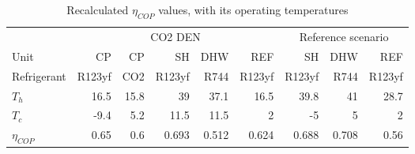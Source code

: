 \begin{table}[h!]
\centering
\caption{Recalculated $\eta_{COP}$ values, with its operating temperatures}\vspace{2mm}
\label{tab:eta_COP_new} 
\begin{tabular}{lrrrrrrrr} \toprule
	& \multicolumn{5}{c}{CO2 DEN} & \multicolumn{3}{c}{Reference scenario} \\
	Unit & CP & CP & SH & DHW & REF & SH & DHW & REF \\ \midrule
	Refrigerant & R123yf & CO2 & R123yf & R744 & R123yf & R123yf & R744 & R123yf \\
$	T_{h}$ & 16.5 & 15.8 & 39 & 37.1 & 16.5 & 39.8 & 41 & 28.7 \\
$	T_{c} $& -9.4 & 5.2 & 11.5 & 11.5 & 2 & -5 & 5 & 2 \\
	$\eta_{COP}$ & 0.65 & 0.6 & 0.693 & 0.512 & 0.624 & 0.688 & 0.708 & 0.56 \\ \bottomrule
\end{tabular}
\end{table}